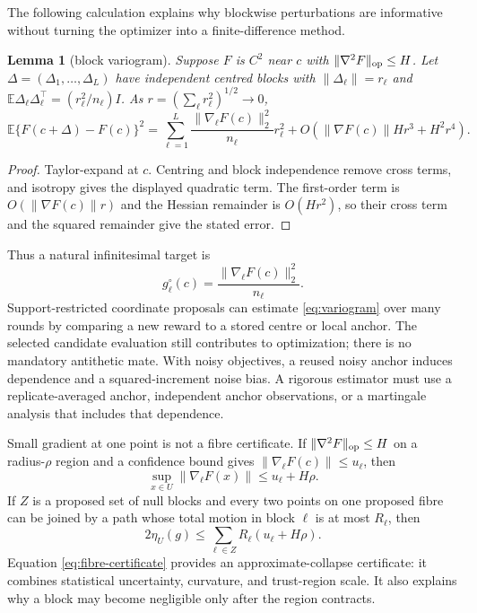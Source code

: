\documentclass[11pt]{article}
\newtheorem{lemma}[theorem]{Lemma}
\theoremstyle{definition}
\theoremstyle{remark}
\newcommand{\E}{\mathbb E}
\newcommand{\1}{\mathbf 1}
\begin{document}
The following calculation explains why blockwise perturbations are informative without turning the
optimizer into a finite-difference method.

\begin{lemma}[block variogram]\label{lem:variogram}
Suppose $F$ is $C^2$ near $c$ with $\|\nabla^2F\|_{\rm op}\le H$.  Let
$\Delta=(\Delta_1,\ldots,\Delta_L)$ have independent centred blocks with
$\|\Delta_\ell\|=r_\ell$ and
$\E\Delta_\ell\Delta_\ell^\top=(r_\ell^2/n_\ell)I$.  As
$r=(\sum_\ell r_\ell^2)^{1/2}\to0$,
\begin{equation}\label{eq:variogram}
  \E\{F(c+\Delta)-F(c)\}^2
  =\sum_{\ell=1}^{L}
  \frac{\|\nabla_\ell F(c)\|_2^2}{n_\ell}r_\ell^2
  +O(\|\nabla F(c)\|Hr^3+H^2r^4).
\end{equation}
\end{lemma}
\begin{proof}
Taylor-expand at $c$.  Centring and block independence remove cross terms, and isotropy gives the
displayed quadratic term.  The first-order term is $O(\|\nabla F(c)\|r)$ and the Hessian remainder
is $O(Hr^2)$, so their cross term and the squared remainder give the stated error.
\end{proof}

Thus a natural infinitesimal target is
\begin{equation}\label{eq:infinitesimal-g}
  g_\ell^\circ(c)=\frac{\|\nabla_\ell F(c)\|_2^2}{n_\ell}.
\end{equation}
Support-restricted coordinate proposals can estimate \eqref{eq:variogram} over many rounds by comparing a new
reward to a stored centre or local anchor.  The selected candidate evaluation still contributes to optimization;
there is no mandatory antithetic mate.  With noisy objectives, a reused noisy anchor induces
dependence and a squared-increment noise bias.  A rigorous estimator must use a replicate-averaged
anchor, independent anchor observations, or a martingale analysis that includes that dependence.

Small gradient at one point is not a fibre certificate.  If
$\|\nabla^2F\|_{\rm op}\le H$ on a radius-$\rho$ region and a confidence bound gives
$\|\nabla_\ell F(c)\|\le u_\ell$, then
\begin{equation}\label{eq:block-gradient-bound}
  \sup_{x\in U}\|\nabla_\ell F(x)\|
  \le u_\ell+H\rho.
\end{equation}
If $Z$ is a proposed set of null blocks and every two points on one proposed fibre can be joined by
a path whose total motion in block $\ell$ is at most $R_\ell$, then
\begin{equation}\label{eq:fibre-certificate}
  2\eta_U(g)
  \le\sum_{\ell\in Z}R_\ell(u_\ell+H\rho).
\end{equation}
Equation \eqref{eq:fibre-certificate} provides an approximate-collapse certificate: it
combines statistical uncertainty, curvature, and trust-region scale.  It also explains why a block
may become negligible only after the region contracts.
\end{document}
